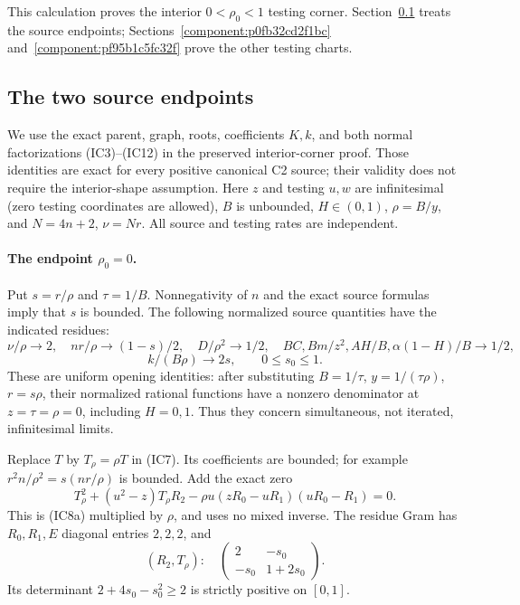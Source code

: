 This calculation proves the interior $0<\rho_0<1$ testing corner. Section~\ref{component:p18dbedfff317} treats the source endpoints; Sections~\ref{component:p0fb32cd2f1bc} and~\ref{component:pf95b1c5fc32f} prove the other testing charts.

\subsection{The two source endpoints}
\label{component:p18dbedfff317}

\label{p18dbedfff317:sec:weak-ih-endpoints}
We use the exact parent, graph, roots, coefficients $K,k$, and both
normal factorizations (IC3)--(IC12) in the preserved interior-corner
proof.  Those identities are exact for every positive canonical C2
source; their validity does not require the interior-shape assumption.
Here $z$ and testing $u,w$ are infinitesimal (zero testing coordinates
are allowed), $B$ is unbounded, $H\in(0,1)$, $\rho=B/y$, and
$N=4n+2$, $\nu=Nr$. All source and testing rates are independent.

\paragraph{The endpoint $\rho_0=0$.}
Put $s=r/\rho$ and $\tau=1/B$. Nonnegativity of $n$ and the exact
source formulas imply that $s$ is bounded. The following normalized
source quantities have the indicated residues:
\[
 \nu/\rho\to2,\quad nr/\rho\to(1-s)/2,\quad
 D/\rho^2\to1/2,\quad BC,Bm/z^2,AH/B,\alpha(1-H)/B\to1/2,
\]
\[
 k/(B\rho)\to2s,\qquad 0\le s_0\le1.
\tag{WIE1}
\]
These are uniform opening identities: after substituting
$B=1/\tau$, $y=1/(\tau\rho)$, $r=s\rho$, their normalized rational
functions have a nonzero denominator at $z=\tau=\rho=0$, including
$H=0,1$. 
Thus they concern simultaneous, not iterated, infinitesimal limits.

Replace $T$ by $T_\rho=\rho T$ in (IC7). Its coefficients are bounded;
for example $r^2n/\rho^2=s(nr/\rho)$ is bounded. Add the exact zero
\[
 T_\rho^2+(u^2-z)T_\rho R_2
 -\rho u(zR_0-uR_1)(uR_0-R_1)=0.
\tag{WIE2}
\]
This is (IC8a) multiplied by $\rho$, and uses no mixed inverse.
The residue Gram has $R_0,R_1,E$ diagonal entries $2,2,2$, and
\[
 (R_2,T_\rho):\quad
 \begin{pmatrix}2&-s_0\\-s_0&1+2s_0\end{pmatrix}.
\]
Its determinant $2+4s_0-s_0^2\ge2$ is strictly positive on $[0,1]$.

